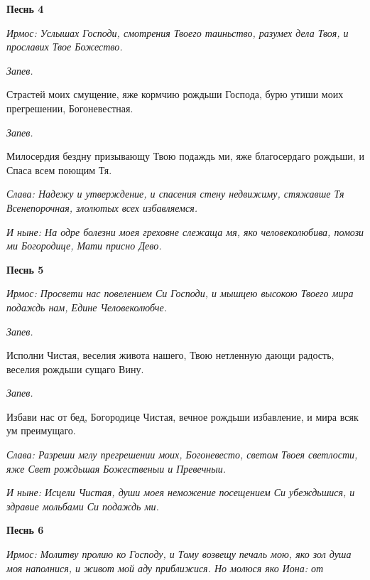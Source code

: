  

\bfseries Песнь 4\normalfont{}


 \itshape Ирмос:\normalfont{} Услышах Господи, смотрения Твоего таиньство, разумех дела
Твоя, и прославих Твое Божество.


 \itshape Запев.\normalfont{}


   Страстей моих смущение, яже кормчию рождьши Господа, бурю утиши
моих прегрешении, Богоневестная.


 \itshape Запев.\normalfont{}


   Милосердия бездну призывающу Твою подаждь ми, яже благосердаго
рождьши, и Спаса всем поющим Тя.


 \itshape Слава:\normalfont{} Надежу и утверждение, и спасения стену недвижиму, стяжавше
Тя Всенепорочная, злолютых всех избавляемся.


 \itshape И ныне:\normalfont{} На одре болезни моея греховне слежаща мя, яко человеколюбива,
помози ми Богородице, Мати присно Дево.






 

\bfseries Песнь 5\normalfont{}


 \itshape Ирмос:\normalfont{} Просвети нас повелением Си Господи, и мышцею высокою Твоего
мира подаждь нам, Едине Человеколюбче.


 \itshape Запев.\normalfont{}


   Исполни Чистая, веселия живота нашего, Твою нетленную дающи
радость, веселия рождьши сущаго Вину.


 \itshape Запев.\normalfont{}


   Избави нас от бед, Богородице Чистая, вечное рождьши избавление, и
мира всяк ум преимущаго.


 \itshape Слава:\normalfont{} Разреши мглу прегрешении моих, Богоневесто, светом Твоея
светлости, яже Свет рождьшая Божественыи и Превечныи.


 \itshape И ныне:\normalfont{} Исцели Чистая, души моея неможение посещением Си
убеждьшися, и здравие мольбами Си подаждь ми.






 

\bfseries Песнь 6\normalfont{}


 \itshape Ирмос:\normalfont{} Молитву пролию ко Господу, и Тому возвещу печаль мою, яко зол
душа моя наполнися, и живот мой аду приближися. Но молюся яко Иона: от

